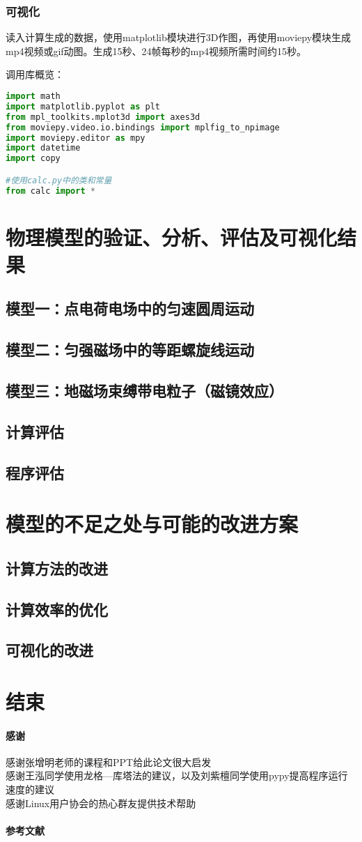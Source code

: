 \documentclass[UTF-8,cs4size]{ctexart}
\begin{document}
\subsubsection{可视化}
读入计算生成的数据，使用matplotlib模块进行3D作图，再使用moviepy模块生成mp4视频或gif动图。生成15秒、24帧每秒的mp4视频所需时间约15秒。


调用库概览：
\begin{lstlisting}[language=Python]
import math
import matplotlib.pyplot as plt
from mpl_toolkits.mplot3d import axes3d
from moviepy.video.io.bindings import mplfig_to_npimage
import moviepy.editor as mpy
import datetime
import copy

#使用calc.py中的类和常量
from calc import *
\end{lstlisting}
\section{物理模型的验证、分析、评估及可视化结果}
\subsection{模型一：点电荷电场中的匀速圆周运动}
\subsection{模型二：匀强磁场中的等距螺旋线运动}
\subsection{模型三：地磁场束缚带电粒子（磁镜效应）}
\subsection{计算评估}
\subsection{程序评估}
\section{模型的不足之处与可能的改进方案}
\subsection{计算方法的改进}
\subsection{计算效率的优化}
\subsection{可视化的改进}
\section{结束}
\paragraph{感谢}
感谢张增明老师的课程和PPT给此论文很大启发\\
感谢王泓同学使用龙格—库塔法的建议，以及刘紫檀同学使用pypy提高程序运行速度的建议\\
感谢Linux用户协会的热心群友提供技术帮助
\paragraph{参考文献}
\end{document}
